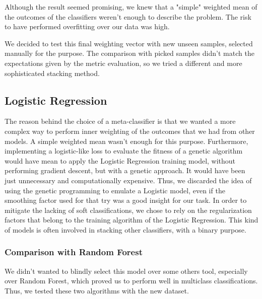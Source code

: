 Although the result seemed promising, we knew that a "simple" weighted mean of the outcomes of the classifiers weren't enough to describe the problem. The risk to have performed overfitting over our data was high.

We decided to test this final weighting vector with new unseen samples, selected manually for the purpose.
The comparison with picked samples didn't match the expectations given by the metric evaluation, so we tried a different and more sophisticated stacking method.

\subsection{Logistic Regression}
The reason behind the choice of a meta-classifier is that we wanted a more complex way to perform inner weighting of the outcomes that we had from other models.
A simple weighted mean wasn't enough for this purpose. Furthermore, implementing a logistic-like loss to evaluate the fitness of a genetic algorithm would have mean to apply the Logistic Regression training model, without performing gradient descent, but with a genetic approach. It would have been just unnecessary and computationally expensive.
Thus, we discarded the idea of using the genetic programming to emulate a Logistic model, even if the smoothing factor used for that try was a good insight for our task.
In order to mitigate the lacking of soft classifications, we chose to rely on the regularization factors that belong to the training algorithm of the Logistic Regression.
This kind of models is often involved in stacking other classifiers, with a binary purpose.



\subsubsection{Comparison with Random Forest}
We didn't wanted to blindly select this model over some others tool, especially over Random Forest, which proved us to perform well in multiclass classifications.
Thus, we tested these two algorithms with the new dataset.

